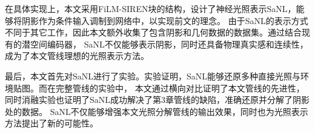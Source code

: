 在具体实现上，本文采用FiLM-SIREN块的结构，设计了神经光照表示SaNL，能够将阴影作为条件输入调制到网络中，以实现前文的理念。
由于SaNL的表示方式不同于其它工作，因此本文额外收集了包含阴影和几何数据的数据集。通过结合现有的潜空间编码器，
SaNL不仅能够表示阴影，同时还具备物理真实感和连续性，成为了本文管线理想的光照表示方法。

最后，本文首先对SaNL进行了实验。实验证明，SaNL能够还原多种直接光照与环境贴图。而在完整管线的实验中，
本文通过横向对比证明了本文管线的先进性，同时消融实验也证明了SaNL成功解决了第3章管线的缺陷，准确还原并分解了阴影处的数据。
SaNL不仅能够增强本文光照分解管线的输出效果，同时也为光照表示方法提出了新的可能性。
